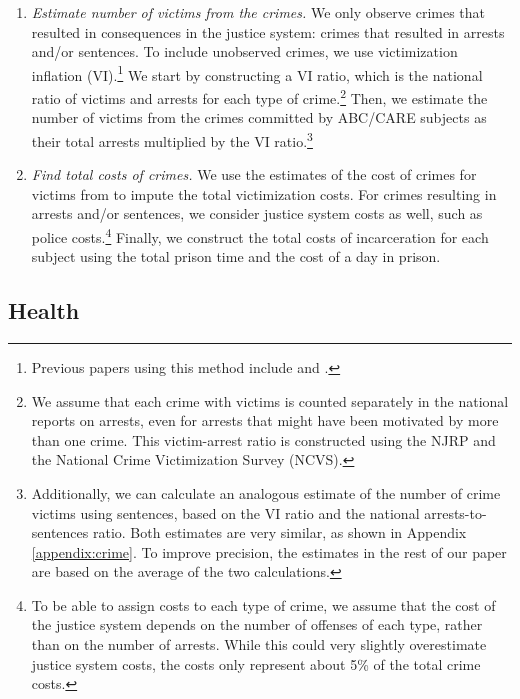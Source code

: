 \begin{enumerate}
\item \textit{Estimate number of victims from the crimes.} We only observe crimes that resulted in consequences in the justice system: crimes that resulted in arrests and/or sentences. To include unobserved crimes, we use victimization inflation (VI).\footnote{Previous papers using this method include \citet{Belfield_Nores_etal_2006_JHR} and \cite{Heckman_Moon_etal_2010_RateofReturn}.} We start by constructing a VI ratio, which is the national ratio of victims and arrests for each type of crime.\footnote{We assume that each crime with victims is counted separately in the national reports on arrests, even for arrests that might have been motivated by more than one crime. This victim-arrest ratio is constructed using the NJRP and the National Crime Victimization Survey (NCVS).} Then, we estimate the number of victims from the crimes committed by ABC/CARE subjects as their total arrests multiplied by the VI ratio.\footnote{Additionally, we can calculate an analogous estimate of the number of crime victims using sentences, based on the VI ratio and the national arrests-to-sentences ratio. Both estimates are very similar, as shown in Appendix \ref{appendix:crime}. To improve precision, the estimates in the rest of our paper are based on the average of the two calculations.}

\item \textit{Find total costs of crimes.} We use the estimates of the cost of crimes for victims from \cite{McCollister_etal_2010_DAD} to impute the total victimization costs. For crimes resulting in arrests and/or sentences, we consider justice system costs as well, such as police costs.\footnote{To be able to assign costs to each type of crime, we assume that the cost of the justice system depends on the number of offenses of each type, rather than on the number of arrests. While this could very slightly overestimate justice system costs, the costs only represent about 5\% of the total crime costs.} Finally, we construct the total costs of incarceration for each subject using the total prison time and the cost of a day in prison.
\end{enumerate}

\subsection{Health} \label{section:health}

